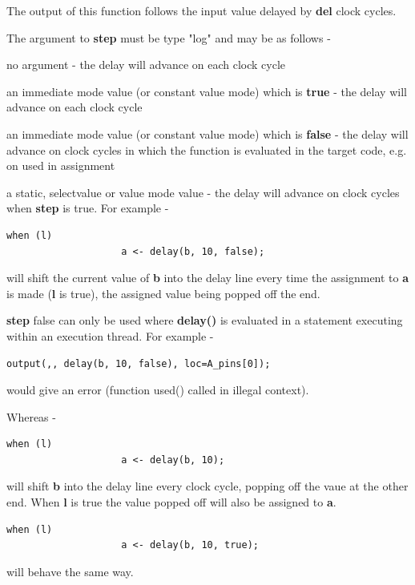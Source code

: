             The output of this function follows the input value delayed by {\bf
            del} clock cycles.
            
            The argument to {\bf step} must be type "log" and may be as follows -
            \blist
            \item   no argument - the delay will advance on each clock cycle
            \item   an immediate mode value (or constant value mode) which is
                    {\bf true} - the delay will advance on each clock cycle
            \item   an immediate mode value (or constant value mode) which is
                    {\bf false} - the delay will advance on clock cycles in
                    which the function is evaluated in the target code, e.g.
                    on used in assignment
            \item   a static, selectvalue or value mode value - the delay will
                    advance on clock cycles when {\bf step} is true.
            \blend
            For example -
            \begin{lstlisting}[gobble=12, language=threepl]
                when (l)
                    a <- delay(b, 10, false);
            \end{lstlisting}
            will shift the current value of {\bf b} into the delay line every
            time the assignment to {\bf a} is made ({\bf l} is true), the
            assigned value being popped off the end.
           
            {\bf step} false can only be used where {\bf delay()} is evaluated
            in a statement executing within an execution thread. For example -
            \begin{lstlisting}[gobble=12, language=threepl]
                output(,, delay(b, 10, false), loc=A_pins[0]);
            \end{lstlisting}
            would give an error (function used() called in illegal context).
            
            Whereas -
            \begin{lstlisting}[gobble=12, language=threepl]
                when (l)
                    a <- delay(b, 10);
            \end{lstlisting}
            will shift {\bf b} into the delay line every clock cycle, popping
            off the vaue at the other end. When {\bf l} is true the value popped
            off will also be assigned to {\bf a}.
            \begin{lstlisting}[gobble=12, language=threepl]
                when (l)
                    a <- delay(b, 10, true);
            \end{lstlisting}
            will behave the same way.

